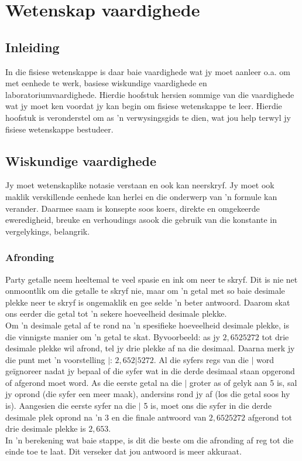          \chapter{Wetenskap vaardighede}
    \setcounter{figure}{1}\setcounter{subfigure}{1}\label{m30853}
    \section{Inleiding}
            \nopagebreak
In die fisiese wetenskappe is daar baie vaardighede wat jy moet aanleer o.a. om met eenhede te werk, basiese wiskundige vaardighede en laboratoriumvaardighede. Hierdie hoofstuk hersien sommige van die vaardighede wat jy moet ken voordat jy kan begin om fisiese wetenskappe te leer. Hierdie hoofstuk is veronderstel om as  'n verwysingsgids te dien, wat jou help terwyl jy fisiese wetenskappe bestudeer. 
\section{Wiskundige vaardighede}
Jy moet wetenskaplike notasie verstaan en ook kan neerskryf. Jy moet ook maklik verskillende eenhede kan herlei en die onderwerp van  'n formule kan verander. Daarmee saam is konsepte soos koers, direkte en omgekeerde eweredigheid, breuke en verhoudings asook die gebruik van die konstante in vergelykings, belangrik.  
\subsection*{Afronding}
Party getalle neem heeltemal te veel spasie en ink om neer te skryf. Dit is nie net onmoontlik om die getalle te skryf nie, maar om  'n getal met so baie desimale plekke neer te skryf is ongemaklik en gee selde  'n beter antwoord. Daarom skat ons eerder die getal tot  'n sekere hoeveelheid desimale plekke. \\
Om  'n desimale getal af te rond na  'n spesifieke hoeveelheid desimale plekke, is die vinnigste manier om  'n getal te skat. Byvoorbeeld: as jy $2,6525272$ tot drie desimale plekke wil afrond, tel jy drie plekke af na die desimaal. Daarna merk jy die punt met  'n voorstelling $|$: $2,652|5272$. Al die syfers regs van die $|$ word geïgnoreer nadat jy bepaal of die syfer wat in die derde desimaal staan opgerond of afgerond moet word. As die eerste getal na die $|$ groter as of gelyk aan 5 is, sal jy oprond (die syfer een meer maak), andersins rond jy af (los die getal soos hy is). Aangesien die eerste syfer na die $|$ 5 is, moet ons die syfer in die derde desimale plek oprond na  'n 3 en die finale antwoord van $2,6525272$ afgerond tot drie desimale plekke is $2,653$. \\
In 'n berekening wat baie stappe, is dit die beste om die afronding af reg tot die einde toe te laat. Dit verseker dat jou antwoord is meer akkuraat.

